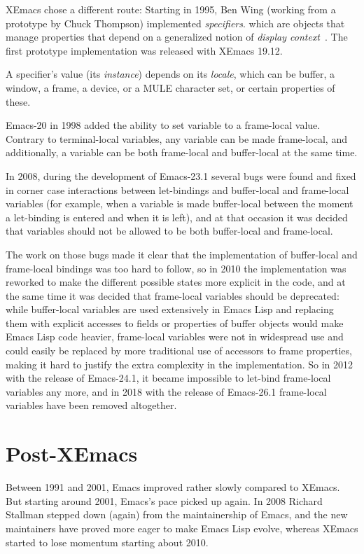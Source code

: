 \documentclass[format=acmsmall, review]{acmart}
\newcommand \Elisp {Emacs Lisp}
\begin{document}
XEmacs chose a different route: Starting in 1995, Ben Wing (working
from a prototype by Chuck Thompson) implemented
\emph{specifiers}. which are objects that manage properties that
depend on a generalized notion of \emph{display
  context}~\cite{XEmacsLispRef1998}.  The first prototype
implementation was released with XEmacs 19.12.

A specifier's value (its \emph{instance}) depends on its
\emph{locale}, which can be buffer, a window, a frame, a device, or a MULE
character set, or certain properties of these.

Emacs-20 in 1998 added the ability to set variable to a frame-local
value.  Contrary to terminal-local variables, any variable can be made
frame-local, and additionally, a variable can be both frame-local and
buffer-local at the same time.

In 2008, during the development of Emacs-23.1 several bugs were found and
fixed in corner case interactions between let-bindings and buffer-local and
frame-local variables (for example, when a variable is made buffer-local
between the moment a let-binding is entered and when it is left), and at
that occasion it was decided that variables should not be allowed to be both
buffer-local and frame-local.

The work on those bugs made it clear that the implementation of buffer-local
and frame-local bindings was too hard to follow, so in 2010 the
implementation was reworked to make the different possible states more
explicit in the code, and at the same time it was decided that frame-local
variables should be deprecated: while buffer-local variables are used
extensively in \Elisp{} and replacing them with explicit accesses to fields
or properties of buffer objects would make \Elisp{} code heavier,
frame-local variables were not in widespread use and could easily be
replaced by more traditional use of accessors to frame properties, making it
hard to justify the extra complexity in the implementation.  So in 2012 with
the release of Emacs-24.1, it became impossible to let-bind frame-local
variables any more, and in 2018 with the release of Emacs-26.1 frame-local
variables have been removed altogether.

\section{Post-XEmacs}           %
\label{sec:post-xemacs}

Between 1991 and 2001, Emacs improved rather slowly compared to XEmacs.
But starting around 2001, Emacs's pace picked up again.  In 2008 Richard
Stallman stepped down (again) from the maintainership of Emacs, and the new
maintainers have proved more eager to make \Elisp{} evolve, whereas XEmacs
started to lose momentum starting about 2010.
\end{document}
